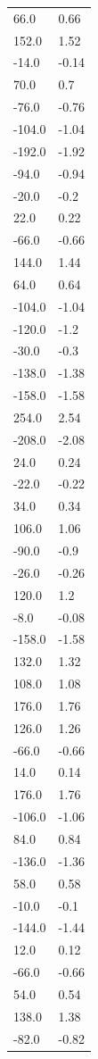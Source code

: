 \begin{longtable}{ll}
66.0 & 0.66 \\
152.0 & 1.52 \\
-14.0 & -0.14 \\
70.0 & 0.7 \\
-76.0 & -0.76 \\
-104.0 & -1.04 \\
-192.0 & -1.92 \\
-94.0 & -0.94 \\
-20.0 & -0.2 \\
22.0 & 0.22 \\
-66.0 & -0.66 \\
144.0 & 1.44 \\
64.0 & 0.64 \\
-104.0 & -1.04 \\
-120.0 & -1.2 \\
-30.0 & -0.3 \\
-138.0 & -1.38 \\
-158.0 & -1.58 \\
254.0 & 2.54 \\
-208.0 & -2.08 \\
24.0 & 0.24 \\
-22.0 & -0.22 \\
34.0 & 0.34 \\
106.0 & 1.06 \\
-90.0 & -0.9 \\
-26.0 & -0.26 \\
120.0 & 1.2 \\
-8.0 & -0.08 \\
-158.0 & -1.58 \\
132.0 & 1.32 \\
108.0 & 1.08 \\
176.0 & 1.76 \\
126.0 & 1.26 \\
-66.0 & -0.66 \\
14.0 & 0.14 \\
176.0 & 1.76 \\
-106.0 & -1.06 \\
84.0 & 0.84 \\
-136.0 & -1.36 \\
58.0 & 0.58 \\
-10.0 & -0.1 \\
-144.0 & -1.44 \\
12.0 & 0.12 \\
-66.0 & -0.66 \\
54.0 & 0.54 \\
138.0 & 1.38 \\
-82.0 & -0.82 \\

\end{longtable}

